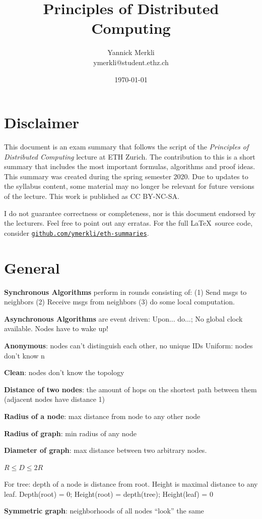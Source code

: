 \documentclass[a4paper, 8pt, landscape]{scrartcl}
\title{Principles of Distributed Computing}
\author{Yannick Merkli \\ymerkli@student.ethz.ch}
\date{\today}
\begin{document}
\begin{multicols*}{3}
	
\section*{Disclaimer}

This document is an exam summary that follows the script of the \textit{Principles of Distributed Computing} lecture  at ETH Zurich. The contribution to this is a short summary that includes the most important formulas, algorithms and proof ideas. This summary was created during the spring semester 2020. Due to updates to the syllabus content, some material may no longer be relevant for future versions of the lecture. This work is published as CC BY-NC-SA.

\begin{center}
	\ccbyncsa
\end{center}

I do not guarantee correctness or completeness, nor is this document endorsed by the lecturers. Feel free to point out any erratas. For the full \LaTeX \ source code, consider \texttt{\href{https://github.com/ymerkli/eth-summaries}{github.com/ymerkli/eth-summaries}}.
	
\newpage	

\maketitle 
\section*{General}
\begin{compactitem}
	\item \textbf{Synchronous Algorithms} perform in rounds consisting of:
	(1) Send msgs to neighbors (2) Receive msgs from neighbors (3) do some local computation.
	\item \textbf{Asynchronous Algorithms} are event driven: Upon... do...;	No global clock available. Nodes have to wake up!
	\item \textbf{Anonymous}: nodes can’t distinguish each other, no unique IDs
	Uniform: nodes don’t know n
	\item \textbf{Clean}: nodes don’t know the topology
	\item \textbf{Distance of two nodes}: the amount of hops on the shortest path between them (adjacent nodes have distance 1)
	\item \textbf{Radius of a node}: max distance from node to any other node
	\item \textbf{Radius of graph}: min radius of any node
	\item \textbf{Diameter of graph}: max distance between two arbitrary nodes.
	\item $R \leq D \leq 2R$
	\item For tree: depth of a node is distance from root. Height is maximal distance to any leaf. Depth(root) = 0; Height(root) = depth(tree); Height(leaf) = 0
	\item \textbf{Symmetric graph}: neighborhoods of all nodes “look” the same
\end{compactitem}

\end{multicols*}
\end{document}

